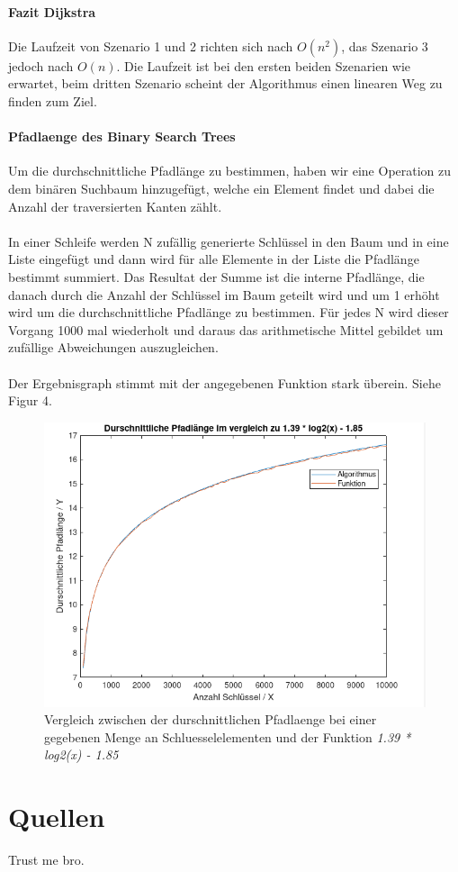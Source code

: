 \documentclass[utf8]{article}
\begin{document}
\paragraph{Fazit Dijkstra} Die Laufzeit von Szenario 1 und 2 richten sich nach
$O(n^2)$, das Szenario 3 jedoch nach $O(n)$. Die Laufzeit ist bei den ersten beiden
Szenarien wie erwartet, beim dritten Szenario scheint der Algorithmus einen
linearen Weg zu finden zum Ziel.

\paragraph{Pfadlaenge des Binary Search Trees}
Um die durchschnittliche Pfadlänge zu bestimmen, haben wir
eine Operation zu dem binären Suchbaum hinzugefügt, welche
ein Element findet und dabei die Anzahl der traversierten
Kanten zählt.\\\\
In einer Schleife werden N zufällig generierte Schlüssel in den Baum
und in eine Liste eingefügt und dann wird für alle Elemente in der
Liste die Pfadlänge bestimmt summiert. Das Resultat der Summe
ist die interne Pfadlänge, die danach durch die Anzahl der Schlüssel
im Baum geteilt wird und um 1 erhöht wird um die durchschnittliche
Pfadlänge zu bestimmen. Für jedes N wird dieser Vorgang 1000 mal
wiederholt und daraus das arithmetische Mittel gebildet um
zufällige Abweichungen auszugleichen.\\\\
Der Ergebnisgraph stimmt mit der angegebenen
Funktion stark überein. Siehe Figur 4.

\begin{figure}[H]
  \centering
  \includegraphics[width=1\textwidth]{Images/Pfadlaenge.png}
  \caption[]{Vergleich zwischen der durschnittlichen Pfadlaenge bei einer
  gegebenen Menge an Schluesselelementen und der Funktion \emph{1.39 * log2(x) - 1.85}}
\end{figure}

\section{Quellen}
Trust me bro.
\end{document}
